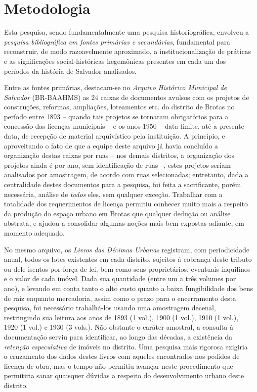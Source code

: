 \section{Metodologia}
\label{sec:metodo}

Esta pesquisa, sendo fundamentalmente uma pesquisa historiográfica, envolveu a \textit{pesquisa bibliográfica em fontes primárias e secundárias}, fundamental para reconstruir, de modo razoavelmente aproximado, a institucionalização de práticas \cite{BERNARDO1991} e as significações social-históricas \cite{CASTORIADIS1982} hegemônicas presentes em cada um dos períodos da história de Salvador analisados.

Entre as fontes primárias, destacam-se no \textit{Arquivo Histórico Municipal de Salvador} (BR-BAAHMS) as 24 caixas de documentos avulsos com os projetos de construções, reformas, ampliações, loteamentos etc. do distrito de Brotas no período entre 1893 -- quando tais projetos se tornaram obrigatórios para a concessão das licenças municipais -- e os anos 1950 -- data-limite, até a presente data, de recepção de material arquivístico pela instituição. A princípio, e aproveitando o fato de que a equipe deste arquivo já havia concluído a organização destas caixas por ruas -- nos demais distritos, a organização dos projetos ainda é por ano, sem identificação de ruas --, estes projetos seriam analisados por amostragem, de acordo com ruas selecionadas; entretanto, dada a centralidade destes documentos para a pesquisa, foi feita a sacrificante, porém necessária, análise de \textit{todos} eles, sem qualquer exceção. Trabalhar com a totalidade dos requerimentos de licença permitiu conhecer muito mais a respeito da produção do espaço urbano em Brotas que qualquer dedução ou análise abstrata, e ajudou a consolidar algumas noções mais bem expostas adiante, em momento adequado.

No mesmo arquivo, os \textit{Livros das Décimas Urbanas} registram, com periodicidade anual, todos os lotes existentes em cada distrito, sujeitos à cobrança deste tributo ou dele isentos por força de lei, bem como seus proprietários, eventuais inquilinos e o valor de cada imóvel. Dada sua quantidade (entre um a três volumes por ano), e levando em conta tanto o alto custo quanto a baixa fungibilidade dos bens de raiz enquanto mercadoria, assim como o prazo para o encerramento desta pesquisa, foi necessário trabalhá-los usando uma amostragem decenal, restringindo sua leitura aos anos de 1893 (1 vol.), 1900 (1 vol.), 1910 (1 vol.), 1920 (1 vol.) e 1930 (3 vols.). Não obstante o caráter amostral, a consulta à documentação serviu para identificar, ao longo das décadas, a existência da \textit{retenção especulativa} de imóveis no distrito. Uma pesquisa mais rigorosa exigiria o cruzamento dos dados destes livros com aqueles encontrados nos pedidos de licença de obra, mas o tempo não permitiu avançar neste procedimento que permitiria sanar quaisquer dúvidas a respeito do desenvolvimento urbano deste distrito.

